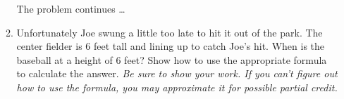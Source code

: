 \documentclass[12pt]{article}
\begin{document}
\begin{enumerate}
\begin{enumerate}
\newpage

\hspace{-.5in}  The problem continues \dots

\item Unfortunately Joe swung a little too late to hit it out of the park. The center fielder is 6 feet tall and lining up to catch Joe's hit.  When is the baseball at a height of 6 feet?  Show how to use the appropriate formula to calculate the answer.  \emph{Be sure to show your work.  If you can't figure out how to use the formula, you may approximate it for possible partial credit.}
\vfill
\vfill
\end{enumerate}







\end{enumerate}
\end{document}
